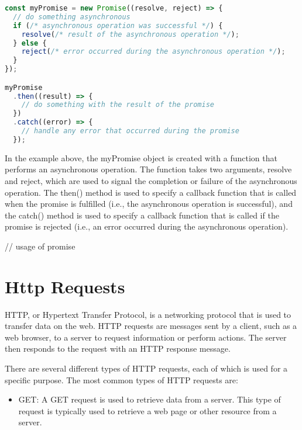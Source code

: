 { \begin{lstlisting}[language=Javascript, caption=Example of promises]
 const myPromise = new Promise((resolve, reject) => {
  // do something asynchronous
  if (/* asynchronous operation was successful */) {
    resolve(/* result of the asynchronous operation */);
  } else {
    reject(/* error occurred during the asynchronous operation */);
  }
});

myPromise
  .then((result) => {
    // do something with the result of the promise
  })
  .catch((error) => {
    // handle any error that occurred during the promise
  });
 \end{lstlisting}
 In the example above, the myPromise object is created with a function that performs an asynchronous operation. The function takes two arguments, resolve and reject, which are used to signal the completion or failure of the asynchronous operation. The then() method is used to specify a callback function that is called when the promise is fulfilled (i.e., the asynchronous operation is successful), and the catch() method is used to specify a callback function that is called if the promise is rejected (i.e., an error occurred during the asynchronous operation).


 // usage of promise



\section{Http Requests}

HTTP, or Hypertext Transfer Protocol, is a networking protocol that is used to transfer data on the web. HTTP requests are messages sent by a client, such as a web browser, to a server to request information or perform actions. The server then responds to the request with an HTTP response message.

There are several different types of HTTP requests, each of which is used for a specific purpose. The most common types of HTTP requests are:
\begin{itemize}
\item GET: A GET request is used to retrieve data from a server. This type of request is typically used to retrieve a web page or other resource from a server.


\end{itemize}}
